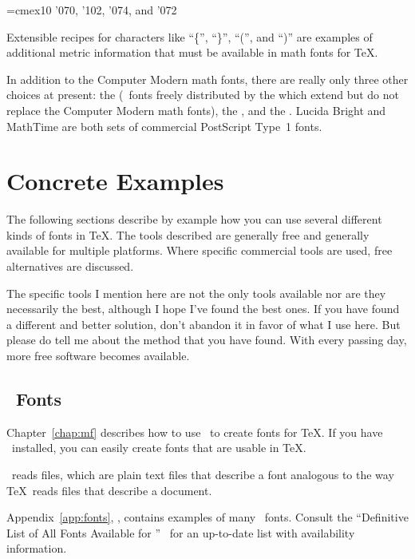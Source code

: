 \begin{exindent}
\font\mathex=cmex10
{\mathex\char'070}, {\mathex\char'102}, 
{\mathex\char'074}, and {\mathex\char'072}
\end{exindent}

Extensible recipes for characters like ``\{'', ``\}'', ``('', and ``)''
are examples of additional metric information that must be available in
math fonts for \TeX.

In addition to the Computer Modern math fonts, there are really only
three other choices at present: the  
(\MF\ fonts freely
distributed by the  which extend but do
not replace the Computer Modern math fonts), the , and the .
Lucida Bright and MathTime are both sets of commercial PostScript Type~1
fonts.

\section{Concrete Examples}

The following sections describe by example how you can use several
different kinds of fonts in \TeX.  The tools described are generally
free and generally available for multiple platforms.  Where specific
commercial tools are used, free alternatives are discussed.  

The specific tools I mention here are not
the only tools available nor are they necessarily the best,
although I hope I've found the best ones.  If you have
found a different and better solution, don't abandon it in favor of what
I use here.  But please do tell me about the method that
you have found.  With every passing day, more free software becomes
available.  

\subsection{\protect\MF\ Fonts}

Chapter~\ref{chap:mf} describes how to use
\MF\ to create fonts for \TeX. If 
you have \MF\ installed, you can
easily create fonts that are usable in \TeX.  

\MF\ reads  files, which are plain text files that describe
a font analogous to the way \TeX\ reads  files that
describe a document.

Appendix~\ref{app:fonts}, \textit{}, contains
examples of many \MF\ fonts.  Consult the ``Definitive List of All
Fonts Available for {\MF}''~\cite{lreq:metafonts} for an up-to-date
list with availability information.

